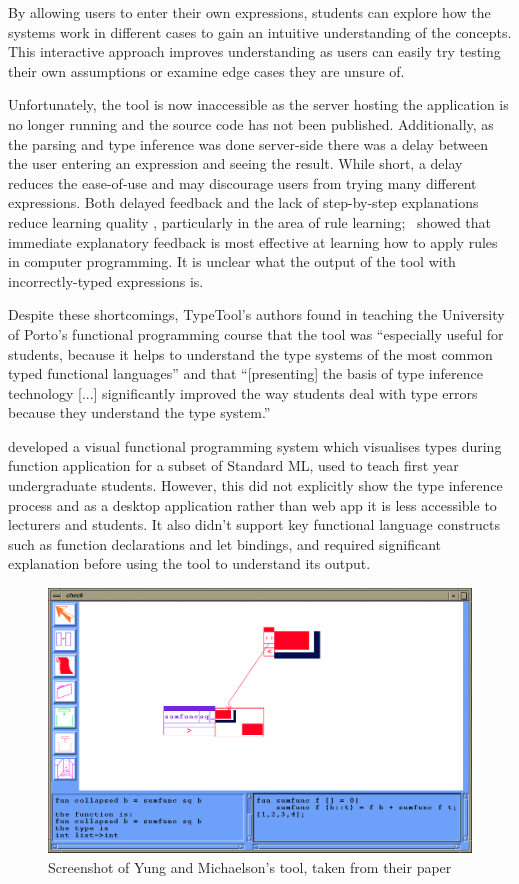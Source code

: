 \documentclass[a4paper,fleqn,12pt]{article}
\begin{document}
By allowing users to enter their own expressions, students can explore how the systems work in different cases to gain an intuitive understanding of the concepts. This interactive approach improves understanding as users can easily try testing their own assumptions or examine edge cases they are unsure of.

Unfortunately, the tool is now inaccessible as the server hosting the application is no longer running and the source code has not been published. Additionally, as the parsing and type inference was done server-side there was a delay between the user entering an expression and seeing the result. While short, a delay reduces the ease-of-use and may discourage users from trying many different expressions. Both delayed feedback and the lack of step-by-step explanations reduce learning quality \citep{ref5}, particularly in the area of rule learning;~\cite{ref6} showed that immediate explanatory feedback is most effective at learning how to apply rules in computer programming. It is unclear what the output of the tool with incorrectly-typed expressions is.

Despite these shortcomings, TypeTool’s authors found in teaching the University of Porto’s functional programming course that the tool was “especially useful for students, because it helps to understand the type systems of the most common typed functional languages” and that “[presenting] the basis of type inference technology [...] significantly improved the way students deal with type errors because they understand the type system.”

\cite{ref7} developed a visual functional programming system which visualises types during function application for a subset of Standard ML, used to teach first year undergraduate students. However, this did not explicitly show the type inference process and as a desktop application rather than web app it is less accessible to lecturers and students. It also didn’t support key functional language constructs such as function declarations and let bindings, and required significant explanation before using the tool to understand its output.

{\centering \begin{figure}[h!]
  \centering
  \includegraphics[width=0.797\linewidth]{images/image1.png}
  \caption{Screenshot of Yung and Michaelson's tool, taken from their paper}
\end{figure} \par}
\end{document}
